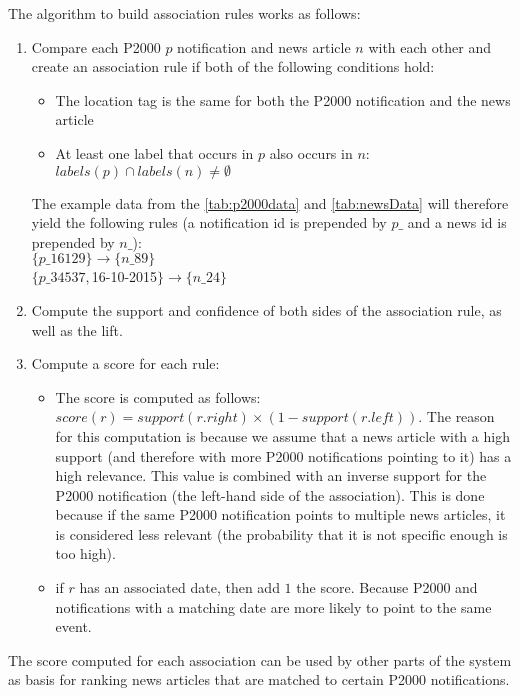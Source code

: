 The algorithm to build association rules works as follows:
\begin{enumerate}
\item Compare each P2000 $p$ notification and news article $n$ with each other and create an association rule if both of the following conditions hold: 
\begin{itemize}[noitemsep]
\item The location tag is the same for both the P2000 notification and the news article
\item At least one label that occurs in $p$ also occurs in $n$: $labels(p) \cap labels(n) \not= \emptyset$
\end{itemize}
The example data from the \autoref{tab:p2000data} and \autoref{tab:newsData} will therefore yield the following rules (a notification id is prepended by $p\_$ and a news id is prepended by $n\_$):\\
$\{p\_16129\} \rightarrow \{n\_89\}$\\
$\{p\_34537, $16-10-2015$\} \rightarrow \{n\_24\}$
\item Compute the support and confidence of both sides of the association rule, as well as the lift.
\item Compute a score for each rule:
\begin{itemize}
\item The score is computed as follows: $score(r) = support(r.right) \times (1-support(r.left))$. The reason for this computation is because we assume that a news article with a high support (and therefore with more P2000 notifications pointing to it) has a high relevance. This value is combined with an inverse support for the P2000 notification (the left-hand side of the association). This is done because if the same P2000 notification points to multiple news articles, it is considered less relevant (the probability that it is not specific enough is too high). 
\item if $r$ has an associated date, then add $1$ the score. Because P2000 and notifications with a matching date are more likely to point to the same event.
\end{itemize}
\end{enumerate}

The score computed for each association can be used by other parts of the system as basis for ranking news articles that are matched to certain P2000 notifications.


